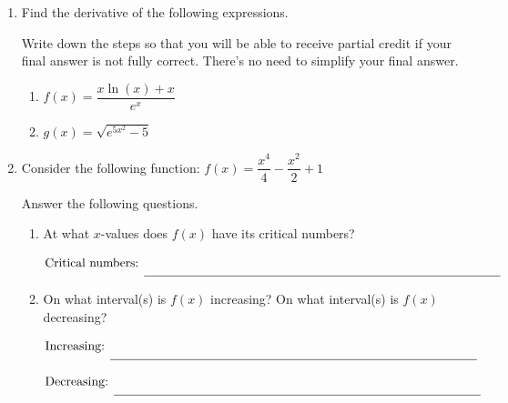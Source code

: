 \documentclass[11pt]{article}
\begin{document}
\begin{enumerate}

\item Find the derivative of the following expressions. 

Write down the steps so that you will be able to receive partial credit if your final answer is not fully correct. There's no need to simplify your final answer.

\begin{enumerate}
\item $f(x) = \dfrac{x \ln(x) + x}{e^x}$

\vfill

\item $g(x) = \sqrt{e^{5x^2}-5}$

\vfill 
\end{enumerate}



\newpage


\item Consider the following function:
$f(x) = \dfrac{x^4}{4} - \dfrac{x^2}{2} + 1$

Answer the following questions. 

\begin{enumerate}
    \item At what $x$-values does $f(x)$ have its critical numbers?
\vspace{3cm}

    {\large
        \[\text{Critical numbers: } \rule[-8pt]{4in}{0.4pt}\]
    }
    \item On what interval(s) is $f(x)$ increasing? On what interval(s) is $f(x)$ decreasing?

\vspace{3cm}

    {\large
        \[\text{Increasing: } \rule[-8pt]{4in}{0.4pt}\]
    }

    {\large
        \[\text{Decreasing: } \rule[-8pt]{4in}{0.4pt}\]
    }


\end{enumerate}
\end{enumerate}
\end{document}
